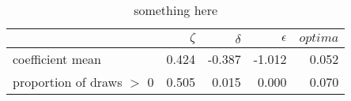 \begin{table}[ht]
\centering
\begin{tabular}{lrrrr}
  \hline
  & $\zeta$ & $\delta$ & $\epsilon$ & $optima$ \\ 
  \hline
coefficient mean & 0.424 & -0.387 & -1.012 & 0.052 \\ 
  proportion of draws $>$ 0 & 0.505 & 0.015 & 0.000 & 0.070 \\ 
   \hline
\end{tabular}
\caption{something here} 
\end{table}
